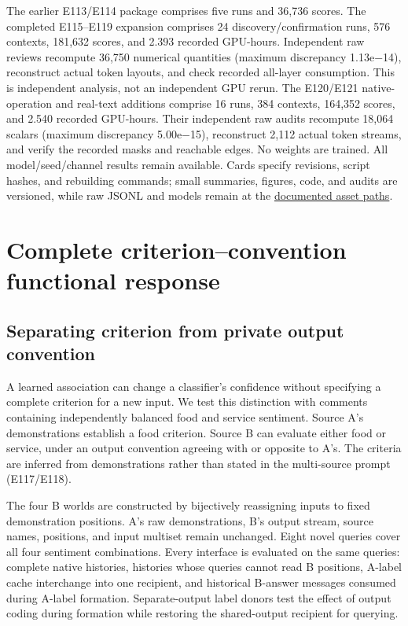 \documentclass[11pt]{article}
\begin{document}
The earlier E113/E114 package comprises five runs and 36,736 scores. The completed E115--E119 expansion comprises 24 discovery/confirmation runs, 576 contexts, 181,632 scores, and 2.393 recorded GPU-hours. Independent raw reviews recompute 36,750 numerical quantities (maximum discrepancy 1.13e−14), reconstruct actual token layouts, and check recorded all-layer consumption. This is independent analysis, not an independent GPU rerun. The E120/E121 native-operation and real-text additions comprise 16 runs, 384 contexts, 164,352 scores, and 2.540 recorded GPU-hours. Their independent raw audits recompute 18,064 scalars (maximum discrepancy 5.00e−15), reconstruct 2,112 actual token streams, and verify the recorded masks and reachable edges. No weights are trained. All model/seed/channel results remain available. Cards specify revisions, script hashes, and rebuilding commands; small summaries, figures, code, and audits are versioned, while raw JSONL and models remain at the \href{README.md}{documented asset paths}.

\section{Complete criterion--convention functional response}\label{complete-criterionconvention-functional-response}

\subsection{Separating criterion from private output convention}\label{separating-criterion-from-private-output-convention}

A learned association can change a classifier's confidence without specifying a complete criterion for a new input. We test this distinction with comments containing independently balanced food and service sentiment. Source A's demonstrations establish a food criterion. Source B can evaluate either food or service, under an output convention agreeing with or opposite to A's. The criteria are inferred from demonstrations rather than stated in the multi-source prompt (E117/E118).

The four B worlds are constructed by bijectively reassigning inputs to fixed demonstration positions. A's raw demonstrations, B's output stream, source names, positions, and input multiset remain unchanged. Eight novel queries cover all four sentiment combinations. Every interface is evaluated on the same queries: complete native histories, histories whose queries cannot read B positions, A-label cache interchange into one recipient, and historical B-answer messages consumed during A-label formation. Separate-output label donors test the effect of output coding during formation while restoring the shared-output recipient for querying.
\end{document}
